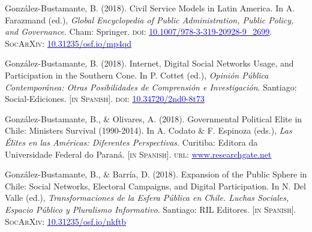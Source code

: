 \begin{publications}

\begin{benumerate}{12}


\item{\small Gonz\'alez-Bustamante, B. (2018). Civil Service Models in Latin America. In A. Farazmand (ed.), {\itshape Global Encyclopedia of Public Administration, Public Policy, and Governance}. Cham: Springer. {\scshape doi}: \href{https://doi.org/10.1007/978-3-319-20928-9\_2699}{\textcolor{blue}{10.1007/978-3-319-20928-9\_2699}}. {\scshape \footnotesize SocArXiv}: \href{https://doi.org/10.31235/osf.io/mp4qd}{\textcolor{blue}{10.31235/osf.io/mp4qd}}}\vspace{1mm}

\item{\small Gonz\'alez-Bustamante, B. (2018). Internet, Digital Social Networks Usage, and Participation in the Southern Cone. In P. Cottet (ed.), {\itshape Opini\'on P\'ublica Contempor\'anea: Otras Posibilidades de Comprensi\'on e Investigaci\'on}. Santiago: Social-Ediciones. {\footnotesize \scshape [in Spanish]}. {\scshape doi}: \href{https://doi.org/10.34720/2nd0-8t73}{\textcolor{blue}{10.34720/2nd0-8t73}}}\vspace{1mm}

\item{\small Gonz\'alez-Bustamante, B., \& Olivares, A. (2018). Governmental Political Elite in Chile: Ministers Survival (1990-2014). In A. Codato \& F. Espinoza (eds.), {\itshape Las \'Elites en las Am\'ericas: Diferentes Perspectivas}. Curitiba: Editora da Universidade Federal do Paraná. {\footnotesize \scshape [in Spanish]}. {\scshape url}: \href{https://www.researchgate.net/publication/325699783_Elites_en_las_Americas_diferentes_perspectivas_Elites_in_the_Americas_Different_Perspectives}{\textcolor{blue}{www.researchgate.net}}}\vspace{1mm}

\item{\small Gonz\'alez-Bustamante, B., \& Barr\'ia, D. (2018). Expansion of the Public Sphere in Chile: Social Networks, Electoral Campaigns, and Digital Participation. In N. Del Valle (ed.), {\itshape Transformaciones de la Esfera P\'ublica en Chile. Luchas Sociales, Espacio P\'ublico y Pluralismo Informativo}. Santiago: RIL Editores. {\footnotesize \scshape [in Spanish]}. {\scshape \footnotesize SocArXiv}: \href{https://doi.org/10.31235/osf.io/nkftb}{\textcolor{blue}{10.31235/osf.io/nkftb}}}\vspace{1mm}


\end{benumerate}
\end{publications}
